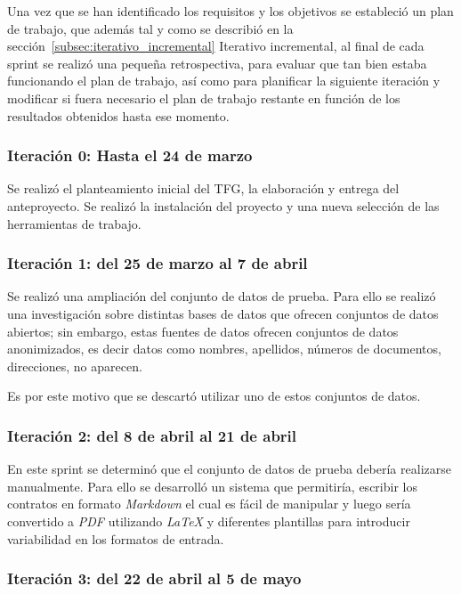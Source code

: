 Una vez que se han identificado los requisitos y los objetivos se estableció un plan de trabajo, que además tal y como
se describió en la sección~\ref{subsec:iterativo_incremental} Iterativo incremental, al final de cada sprint se realizó
una pequeña retrospectiva, para evaluar que tan bien estaba funcionando el plan de trabajo, así como para planificar
la siguiente iteración y modificar si fuera necesario el plan de trabajo restante en función de los resultados obtenidos
hasta ese momento.

\subsubsection*{Iteración 0: Hasta el 24 de marzo}

Se realizó el planteamiento inicial del TFG, la elaboración y entrega del anteproyecto.
Se realizó la instalación del proyecto y una nueva selección de las herramientas de trabajo.

\subsubsection*{Iteración 1: del 25 de marzo al 7 de abril}

Se realizó una ampliación del conjunto de datos de prueba.
Para ello se realizó una investigación sobre distintas bases de datos que ofrecen conjuntos de datos abiertos; sin
embargo, estas fuentes de datos ofrecen conjuntos de datos anonimizados, es decir datos como nombres, apellidos,
números de documentos, direcciones, no aparecen.

Es por este motivo que se descartó utilizar uno de estos conjuntos de datos.

\subsubsection*{Iteración 2: del 8 de abril al 21 de abril}

En este sprint se determinó que el conjunto de datos de prueba debería realizarse manualmente.
Para ello se desarrolló un sistema que permitiría, escribir los contratos en formato \textit{Markdown} el cual es fácil
de manipular y luego sería convertido a \textit{PDF} utilizando \textit{LaTeX} y diferentes plantillas para introducir
variabilidad en los formatos de entrada.

\subsubsection*{Iteración 3: del 22 de abril al 5 de mayo}

